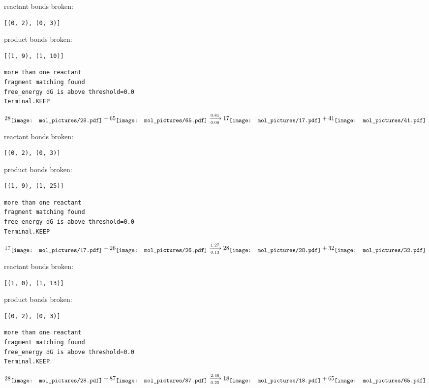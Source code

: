 \documentclass{article}
\begin{document}
reactant bonds broken:\begin{verbatim}
[(0, 2), (0, 3)]
\end{verbatim}
product bonds broken:\begin{verbatim}
[(1, 9), (1, 10)]
\end{verbatim}




\vspace{1cm}
\begin{verbatim}
more than one reactant
fragment matching found
free_energy dG is above threshold=0.0
Terminal.KEEP
\end{verbatim}
$$
28
\raisebox{-.5\height}{\texttt{[image: mol\_pictures/28.pdf]}}
+
65
\raisebox{-.5\height}{\texttt{[image: mol\_pictures/65.pdf]}}
\xrightarrow[0.08]{0.81}
17
\raisebox{-.5\height}{\texttt{[image: mol\_pictures/17.pdf]}}
+
41
\raisebox{-.5\height}{\texttt{[image: mol\_pictures/41.pdf]}}
$$


reactant bonds broken:\begin{verbatim}
[(0, 2), (0, 3)]
\end{verbatim}
product bonds broken:\begin{verbatim}
[(1, 9), (1, 25)]
\end{verbatim}




\vspace{1cm}
\begin{verbatim}
more than one reactant
fragment matching found
free_energy dG is above threshold=0.0
Terminal.KEEP
\end{verbatim}
$$
17
\raisebox{-.5\height}{\texttt{[image: mol\_pictures/17.pdf]}}
+
26
\raisebox{-.5\height}{\texttt{[image: mol\_pictures/26.pdf]}}
\xrightarrow[0.13]{1.27}
28
\raisebox{-.5\height}{\texttt{[image: mol\_pictures/28.pdf]}}
+
32
\raisebox{-.5\height}{\texttt{[image: mol\_pictures/32.pdf]}}
$$


reactant bonds broken:\begin{verbatim}
[(1, 0), (1, 13)]
\end{verbatim}
product bonds broken:\begin{verbatim}
[(0, 2), (0, 3)]
\end{verbatim}




\vspace{1cm}
\begin{verbatim}
more than one reactant
fragment matching found
free_energy dG is above threshold=0.0
Terminal.KEEP
\end{verbatim}
$$
28
\raisebox{-.5\height}{\texttt{[image: mol\_pictures/28.pdf]}}
+
87
\raisebox{-.5\height}{\texttt{[image: mol\_pictures/87.pdf]}}
\xrightarrow[0.25]{2.46}
18
\raisebox{-.5\height}{\texttt{[image: mol\_pictures/18.pdf]}}
+
65
\raisebox{-.5\height}{\texttt{[image: mol\_pictures/65.pdf]}}
$$
\end{document}
